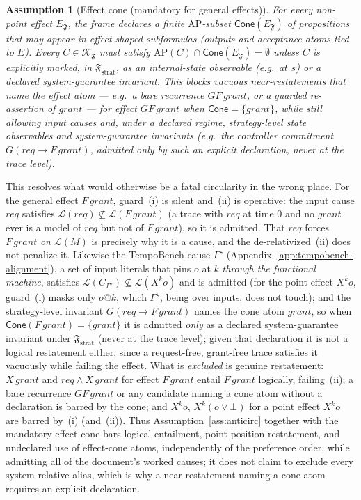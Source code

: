 \documentclass[11pt]{article}
\newtheorem{assumption}{Assumption}
\theoremstyle{remark}
\newcommand{\Lang}{\mathcal{L}}
\newcommand{\Frame}{\mathfrak{F}}
\begin{document}
\begin{assumption}[Effect cone (mandatory for general effects)]
\label{ass:cone}
For every non-point effect \(E_{\Frame}\), the frame declares a finite
\(\mathrm{AP}\)-subset \(\mathsf{Cone}(E_{\Frame})\) of propositions that may
appear in effect-shaped subformulas (outputs and acceptance atoms tied to \(E\)).
Every \(C\in\mathcal{K}_{\Frame}\) must satisfy
\(\mathrm{AP}(C)\cap\mathsf{Cone}(E_{\Frame})=\emptyset\) unless \(C\) is
explicitly marked, in \(\Frame_{\mathrm{strat}}\), as an internal-state observable
(e.g.\ \(\mathit{at\_}s\)) or a declared system-guarantee invariant. This blocks
vacuous near-restatements that name the effect atom --- e.g.\ a bare recurrence
\(GF\,grant\), or a guarded re-assertion of \(grant\) --- for effect \(GF\,grant\)
when \(\mathsf{Cone}=\{grant\}\), while still allowing input causes and, under a
declared regime, strategy-level state observables and system-guarantee invariants
(e.g.\ the controller commitment \(G(req\to F\,grant)\), admitted only by such an
explicit declaration, never at the trace level).
\end{assumption}

This resolves what would otherwise be a fatal circularity in the wrong place. For
the general effect \(F\,grant\), guard~(i) is silent and~(ii) is operative: the
input cause \(req\) satisfies \(\Lang(req)\not\subseteq\Lang(F\,grant)\) (a trace
with \(req\) at time \(0\) and no \(grant\) ever is a model of \(req\) but not of
\(F\,grant\)), so it is admitted. That \(req\) forces \(F\,grant\) \emph{on
\(\Lang(M)\)} is precisely why it is a cause, and the de-relativized~(ii) does not
penalize it. Likewise the TempoBench cause \(\Gamma^\star\)
(Appendix~\ref{app:tempobench-alignment}), a set of input literals that pins \(o\)
at \(k\) \emph{through the functional machine}, satisfies
\(\Lang(C_{\Gamma^\star})\not\subseteq\Lang(X^k o)\) and is admitted (for the point
effect \(X^k o\), guard~(i) masks only \(o@k\), which \(\Gamma^\star\), being over
inputs, does not touch); and the strategy-level invariant \(G(req\rightarrow
F\,grant)\) names the cone atom \(grant\), so when \(\mathsf{Cone}(F\,grant)=
\{grant\}\) it is admitted \emph{only} as a declared system-guarantee invariant
under \(\Frame_{\mathrm{strat}}\) (never at the trace level); given that
declaration it is not a logical restatement either, since a request-free,
grant-free trace satisfies it vacuously while failing the effect. What is
\emph{excluded} is genuine restatement: \(X\,grant\) and
\(req\land X\,grant\) for effect \(F\,grant\) entail \(F\,grant\) logically,
failing~(ii); a bare recurrence \(GF\,grant\) or any candidate naming a cone atom
without a declaration is barred by the cone; and \(X^k o\), \(X^k(o\lor\bot)\) for
a point effect \(X^k o\) are barred by~(i) (and~(ii)). Thus
Assumption~\ref{ass:anticirc} together with the mandatory effect cone bars logical
entailment, point-position restatement, and undeclared use of effect-cone atoms,
independently of the preference order, while admitting all of the document's worked
causes; it does not claim to exclude every system-relative alias, which is why a
near-restatement naming a cone atom requires an explicit declaration.
\end{document}

